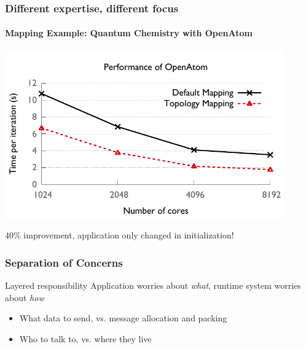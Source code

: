 \begin{frame}
\frametitle{Different expertise, different focus}
\framesubtitle{Mapping Example: Quantum Chemistry with {\sc OpenAtom}}
\includegraphics[width=0.9\textwidth]{../figures/openatom/map.pdf}
\begin{block}{40\% improvement, application only changed in initialization!}\end{block}
\end{frame}


\begin{frame}
\frametitle{Separation of Concerns}
\begin{block}{Layered responsibility}
Application worries about \emph{what}, runtime system worries about \emph{how}
\end{block}
\begin{itemize}
\item What data to send, vs. message allocation and packing
\item Who to talk to, vs. where they live
\end{itemize}
\end{frame}

